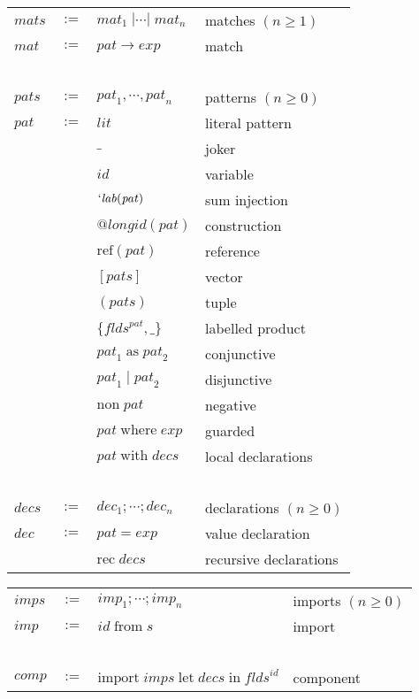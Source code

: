 \documentclass[twoside]{article}
\newcommand{\x}[1]{\mathit{#1}}
\newcommand{\f}[1]{\mbox{#1}}
\newcommand{\lab}{\x{lab}}
\newcommand{\id}{\x{id}}
\newcommand{\longid}{\x{longid}}
\newcommand{\lit}{\x{lit}}
\renewcommand{\exp}{\x{exp}}
\newcommand{\flds}{\x{flds}}
\newcommand{\mat}{\x{mat}}
\newcommand{\mats}{\x{mats}}
\newcommand{\pat}{\x{pat}}
\newcommand{\pats}{\x{pats}}
\newcommand{\dec}{\x{dec}}
\newcommand{\decs}{\x{decs}}
\newcommand{\imp}{\x{imp}}
\newcommand{\imps}{\x{imps}}
\newcommand{\comp}{\x{comp}}
\begin{document}
\begin{center}
\begin{tabular}{lcll}
$\mats$	&$:=$&	$\mat_1\;|\cdots|\;\mat_n$	& matches $(n\geq1)$ \\
$\mat$	&$:=$&	$\pat\to\exp$			& match \\
\ \\

$\pats$	&$:=$&	$\pat_1,\cdots,\pat_n$		& patterns $(n\geq0)$ \\
$\pat$	&$:=$&	$\lit$				& literal pattern \\
	&&	$\f{\_}$			& joker \\
	&&	$\id$				& variable \\
	&&	$`\lab(\pat)$			& sum injection \\
	&&	$@\longid(\pat)$		& construction \\
	&&	$\f{ref}(\pat)$			& reference \\
	&&	$[\pats]$			& vector \\
	&&	$(\pats)$			& tuple \\
	&&	$\{\flds^\pat,\_\}$		& labelled product \\
	&&	$\pat_1\;\f{as}\;\pat_2$	& conjunctive \\
	&&	$\pat_1\;|\;\pat_2$		& disjunctive \\
	&&	$\f{non}\;\pat$			& negative \\
	&&	$\pat\;\f{where}\;\exp$		& guarded \\
	&&	$\pat\;\f{with}\;\decs$		& local declarations \\
\ \\

$\decs$	&$:=$&	$\dec_1;\cdots;\dec_n$		& declarations $(n\geq0)$ \\
$\dec$	&$:=$&	$\pat = \exp$			& value declaration \\
	&&	$\f{rec}\;\decs$		& recursive declarations \\
\end{tabular}
\end{center}

\begin{center}
\begin{tabular}{lcll}

$\imps$	&$:=$&	$\imp_1;\cdots;\imp_n$		& imports $(n\geq0)$ \\
$\imp$	&$:=$&	$\id\;\f{from}\;s$		& import \\
\ \\

$\comp$	&$:=$&	$\f{import}\;\imps\;\f{let}\;\decs\;\f{in}\;\flds^\id$
						& component

\end{tabular}
\end{center}
\end{document}
